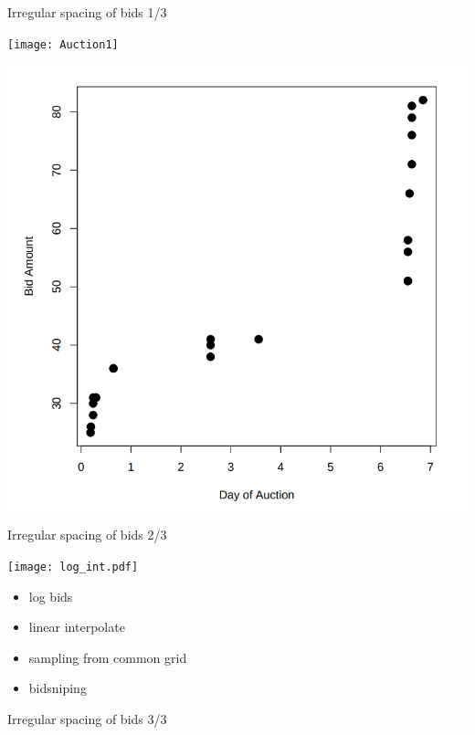 \documentclass[hyperref={pdfpagelabels=false}]{beamer}
\begin{document}
\begin{frame}{Irregular spacing of bids 1/3}
\centering
\begin{minipage}[c]{0.6\textwidth}
\texttt{[image: Auction1]}
\end{minipage}
\begin{minipage}[c]{0.6\textwidth}
\includegraphics[width=\textwidth]{Auction2}
\end{minipage}
\end{frame}

\begin{frame}{Irregular spacing of bids 2/3}
\begin{minipage}[c]{0.65\textwidth}
\texttt{[image: log\_int.pdf]}
\end{minipage}
\hfill
\begin{minipage}[c]{0.3\textwidth}
\begin{itemize}
\item log bids
\item linear interpolate
\item sampling from common grid
\item bidsniping
\end{itemize}
\end{minipage} 
\end{frame}

\begin{frame}{Irregular spacing of bids 3/3}
\end{frame}
\end{document}
